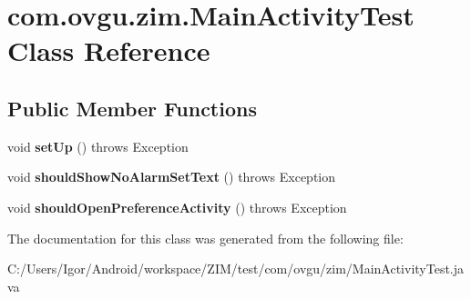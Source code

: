 \hypertarget{classcom_1_1ovgu_1_1zim_1_1_main_activity_test}{\section{com.\-ovgu.\-zim.\-Main\-Activity\-Test Class Reference}
\label{classcom_1_1ovgu_1_1zim_1_1_main_activity_test}
}
\subsection*{Public Member Functions}
\begin{DoxyCompactItemize}
\item 
\hypertarget{classcom_1_1ovgu_1_1zim_1_1_main_activity_test_ab969cb6c01cc9b2bcf8a856bf6528ad2}{void {\bfseries set\-Up} ()  throws Exception }\label{classcom_1_1ovgu_1_1zim_1_1_main_activity_test_ab969cb6c01cc9b2bcf8a856bf6528ad2}

\item 
\hypertarget{classcom_1_1ovgu_1_1zim_1_1_main_activity_test_a0b1194057c307417c06197c1deeda288}{void {\bfseries should\-Show\-No\-Alarm\-Set\-Text} ()  throws Exception }\label{classcom_1_1ovgu_1_1zim_1_1_main_activity_test_a0b1194057c307417c06197c1deeda288}

\item 
\hypertarget{classcom_1_1ovgu_1_1zim_1_1_main_activity_test_aef96db85384591755820a3705a78501b}{void {\bfseries should\-Open\-Preference\-Activity} ()  throws Exception }\label{classcom_1_1ovgu_1_1zim_1_1_main_activity_test_aef96db85384591755820a3705a78501b}

\end{DoxyCompactItemize}


The documentation for this class was generated from the following file\-:\begin{DoxyCompactItemize}
\item 
C\-:/\-Users/\-Igor/\-Android/workspace/\-Z\-I\-M/test/com/ovgu/zim/Main\-Activity\-Test.\-java\end{DoxyCompactItemize}
